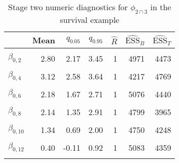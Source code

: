 \begin{table}

\caption{\label{tab:surv-stage-two-diag-phi-23}Stage two numeric diagnostics for $\phi_{2 \cap 3}$ in the survival example}
\centering
\begin{tabular}[t]{lrrrrrr}
\toprule
  & Mean & $q_{0.05}$ & $q_{0.95}$ & $\widehat{R}$ & $\widehat{\text{ESS}}_{B}$ & $\widehat{\text{ESS}}_{T}$\\
\midrule
\cellcolor{gray!6}{$\beta_{0, 1}$} & \cellcolor{gray!6}{2.98} & \cellcolor{gray!6}{2.21} & \cellcolor{gray!6}{3.76} & \cellcolor{gray!6}{1} & \cellcolor{gray!6}{4670} & \cellcolor{gray!6}{4657}\\
$\beta_{0, 2}$ & 2.80 & 2.17 & 3.45 & 1 & 4971 & 4473\\
\cellcolor{gray!6}{$\beta_{0, 3}$} & \cellcolor{gray!6}{0.79} & \cellcolor{gray!6}{0.01} & \cellcolor{gray!6}{1.59} & \cellcolor{gray!6}{1} & \cellcolor{gray!6}{4549} & \cellcolor{gray!6}{4145}\\
$\beta_{0, 4}$ & 3.12 & 2.58 & 3.64 & 1 & 4217 & 4769\\
\cellcolor{gray!6}{$\beta_{0, 5}$} & \cellcolor{gray!6}{0.29} & \cellcolor{gray!6}{-0.50} & \cellcolor{gray!6}{1.09} & \cellcolor{gray!6}{1} & \cellcolor{gray!6}{4532} & \cellcolor{gray!6}{3661}\\
$\beta_{0, 6}$ & 2.18 & 1.67 & 2.71 & 1 & 5076 & 4440\\
\cellcolor{gray!6}{$\beta_{0, 7}$} & \cellcolor{gray!6}{2.41} & \cellcolor{gray!6}{1.74} & \cellcolor{gray!6}{3.06} & \cellcolor{gray!6}{1} & \cellcolor{gray!6}{4650} & \cellcolor{gray!6}{4254}\\
$\beta_{0, 8}$ & 2.14 & 1.35 & 2.91 & 1 & 4799 & 3965\\
\cellcolor{gray!6}{$\beta_{0, 9}$} & \cellcolor{gray!6}{1.81} & \cellcolor{gray!6}{1.17} & \cellcolor{gray!6}{2.47} & \cellcolor{gray!6}{1} & \cellcolor{gray!6}{4765} & \cellcolor{gray!6}{4387}\\
$\beta_{0, 10}$ & 1.34 & 0.69 & 2.00 & 1 & 4750 & 4248\\
\cellcolor{gray!6}{$\beta_{0, 11}$} & \cellcolor{gray!6}{5.27} & \cellcolor{gray!6}{4.67} & \cellcolor{gray!6}{5.87} & \cellcolor{gray!6}{1} & \cellcolor{gray!6}{4056} & \cellcolor{gray!6}{3586}\\
$\beta_{0, 12}$ & 0.40 & -0.11 & 0.92 & 1 & 5083 & 4359\\
\cellcolor{gray!6}{$\beta_{0, 13}$} & \cellcolor{gray!6}{2.11} & \cellcolor{gray!6}{1.34} & \cellcolor{gray!6}{2.89} & \cellcolor{gray!6}{1} & \cellcolor{gray!6}{4599} & \cellcolor{gray!6}{4634}\\

\end{tabular}
\end{table}
